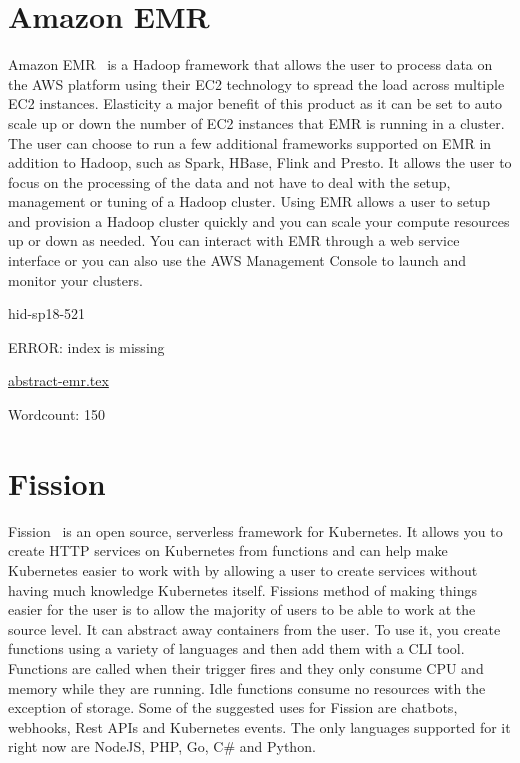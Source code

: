 \section{Amazon EMR}
Amazon EMR~\cite{hid-sp18-521-AmazonEMR} is a Hadoop framework that allows
the user to process data on the AWS platform using their EC2 technology to
spread the load across multiple EC2 instances. Elasticity a major benefit
of this product as it can be set to auto scale up or down the number of
EC2 instances that EMR is running in a cluster. The user can choose to run 
a few additional frameworks supported on EMR in addition to Hadoop,
such as Spark, HBase, Flink and Presto. It allows the user to focus on the
processing of the data and not have to deal with the setup, management or
tuning of a Hadoop cluster. Using EMR allows a user to setup and provision
a Hadoop cluster quickly and you can scale your compute resources up or
down as needed. You can interact with EMR through a web service interface
or you can also use the AWS Management Console to launch and monitor your
clusters.


\begin{IU}

hid-sp18-521

ERROR: index is missing

\href{https://github.com/cloudmesh-community/hid-sp18-521/blob/master//technology/abstract-emr.tex}{abstract-emr.tex}

 

Wordcount: 150

\end{IU}

\section{Fission}
Fission~\cite{hid-sp18-521-FissionBlog} is an open source, serverless
framework for Kubernetes. It allows you to create HTTP services
on Kubernetes from functions and can help make Kubernetes easier
to work with by allowing a user to create services without having
much knowledge Kubernetes itself. Fissions method of making things easier
for the user is to allow the majority of users to be able to work at the
source level. It can abstract away containers from the user. To use 
it, you create functions using a variety of languages and then add them
with a CLI tool. Functions are called when their trigger fires and they
only consume CPU and memory while they are running. Idle functions
consume no resources with the exception of storage. Some of the 
suggested uses for Fission are chatbots, webhooks, Rest APIs and 
Kubernetes events. The only languages supported for it right now
are NodeJS, PHP, Go, C\# and Python.


